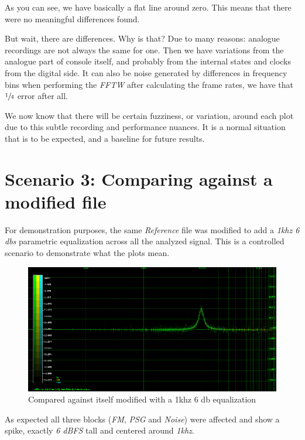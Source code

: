 \documentclass[10pt,a4paper]{report}
\begin{document}
As you can see, we have basically a flat line around zero. This means that there were no meaningful differences found. 

But wait, there are differences. Why is that? Due to many reasons: analogue recordings are not always the same for one. Then we have variations from the analogue part of console itself, and probably from the internal states and clocks from the digital side. It can also be noise generated by differences in frequency bins when performing the \textit{FFTW} after calculating the frame rates, we have that $\sfrac{1}{4}$ error after all.

We now know that there will be certain fuzziness, or variation, around each plot due to this subtle recording and performance nuances. It is a normal situation that is to be expected, and a baseline for future results.

\section{Scenario 3: Comparing against a modified file}

For demonstration purposes, the same \textit{Reference} file was modified to add a \textit{1khz 6 dbs} parametric equalization across all the analyzed signal. This is a controlled scenario to demonstrate what the plots mean.

\begin{figure}[H]
	\centering
	\includegraphics[width=1.0\linewidth]{plots/Plot3-Modified}
	\caption[1khz modified]{Compared against itself modified with a 1khz 6 db equalization}
	\label{fig:plot3-modified}
\end{figure}

As expected all three blocks (\textit{FM}, \textit{PSG} and \textit{Noise}) were affected and show a spike, exactly \textit{6 dBFS} tall and centered around \textit{1khz}.
\end{document}

